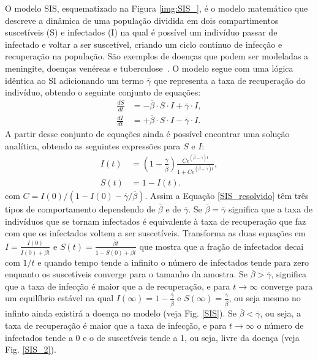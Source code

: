O modelo SIS, esquematizado na Figura \ref{img:SIS_},  é o modelo matemático 
que descreve a dinâmica de uma população dividida em dois compartimentos suscetíveis (S) e infectados (I) na qual é possível um indivíduo passar de infectado e voltar a ser suscetível, criando um ciclo contínuo de infecção e recuperação na população. São exemplos de doenças que podem ser modeladas a meningite, doenças venéreas e tuberculose~\cite{modelos}. O modelo segue com uma lógica idêntica ao SI adicionando um termo $\overline{\gamma}$ que representa a taxa de recuperação do indivíduo, obtendo o seguinte conjunto de equações:
\begin{align}
\frac{dS}{dt} &= -\overline{\beta} \cdot S \cdot I+ \overline{\gamma} \cdot I, \label{SIS-1} \\
\frac{dI}{dt} &= +\overline{\beta} \cdot S \cdot I- \overline{\gamma} \cdot I.\label{SIS-2} 
\end{align}
A partir desse conjunto de equações ainda é possível encontrar uma solução analítica,
obtendo as seguintes 
expressões 
para $S$ e $I$:
\begin{align}
I(t) &= \left(1 - \frac{\overline{\gamma}}{\overline{\beta}}\right)\frac{Ce^{(\overline{\beta} - \overline{\gamma})t}}{1 + Ce^{(\overline{\beta} - \overline{\gamma})t}}, \\
S(t) &= 1 - I(t).
\label{SIS_resolvido}
\end{align}
com 
$C = I(0)/(1 - I(0) - \overline{\gamma}/\overline{\beta})$. Assim a Equação \ref{SIS_resolvido} têm três tipos de comportamento dependendo de $\overline{\beta}$ e de $\overline{\gamma}$. Se $\overline{\beta} = \overline{\gamma}$ significa que a taxa de indivíduos que se tornam infectados é equivalente à taxa de recuperação que faz com que os infectados voltem a ser suscetíveis. Transforma as duas equações em $I = \frac{I(0)}{I(0)+ \overline{\beta} t}$ e $S(t) = \frac{\overline{\beta} t}{1 - S(0) + \overline{\beta} t}$ que mostra que a fração de infectados decai com $1/t$ e quando tempo tende a infinito o número de infectados tende para zero enquanto os suscetíveis converge para o tamanho da amostra. 
Se $\overline{\beta} > \overline{\gamma}$, significa que a taxa de infecção é maior que a de recuperação, e para $t \rightarrow \infty$ converge para um equilíbrio estável na qual $I(\infty) = 1 - \frac{\overline{\gamma}}{\overline{\beta}}$ e $S(\infty) = \frac{\overline{\gamma}}{\overline{\beta}}$, ou seja mesmo no infinto  ainda existirá a doença no modelo
(veja Fig. \ref{SIS}). 
Se $\overline{\beta} < \overline{\gamma}$, ou seja, a taxa de recuperação é maior que a taxa de infecção, e para $t \rightarrow \infty$ o número de infectados tende a 0 e o de suscetíveis tende a 1, ou seja, livre da doença 
(veja Fig. \ref{SIS_2}).

